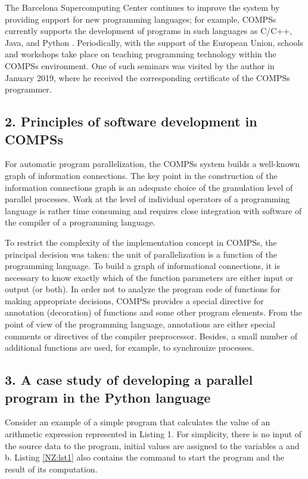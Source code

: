 \documentclass[10pt, a5paper]{article}
\begin{document}
The Barcelona Supercomputing Center continues to improve the system by providing support for new programming languages; for exam\-ple, COMPSs currently supports the development of programs in such languages as C/C++, Java, and Python \cite{bib3}. Periodically, with the support of the European Union, schools and workshops take place on teaching programming technology within the COMPSs environment. One of such seminars was visited by the author in January 2019, where he received the corresponding certificate of the COMPSs programmer.

\subsection*{2. Principles of software development in COMPSs}

For automatic program parallelization, the COMPSs system builds a well-known graph of information connections. The key point in the construction of the information connections graph is an adequate choice of the granulation level of parallel processes. Work at the level of individual operators of a programming language is rather time consu\-ming and requires close integration with software of the compiler of a programming language.

To restrict the complexity of the implementation concept in \linebreak COMPSs, the principal decision was taken: the unit of parallelization is a function of the programming language. To build a graph of informati\-onal connec\-tions, it is necessary to know exactly which of the function parameters are either input or output (or both). In order not to analyze the program code of functions for making appropriate decisions, \linebreak COMPSs provides a special directive for annotation (decoration) of functions and some other program elements. From the point of view of the programming language, annotations are either special comments or directives of the compiler preprocessor. Besides, a small number of additional functions are used, for example, to synchronize processes.

\subsection*{3. A case study of developing a parallel program in the Python language}

Consider an example of a simple program that calculates the value of an arithmetic expression represented in Listing 1. For simplicity, there is no input of the source data to the program, initial values are assigned to the variables a and b. Listing \ref{NZ:lst1} also contains the command to start the program and the result of its computation.
\end{document}
